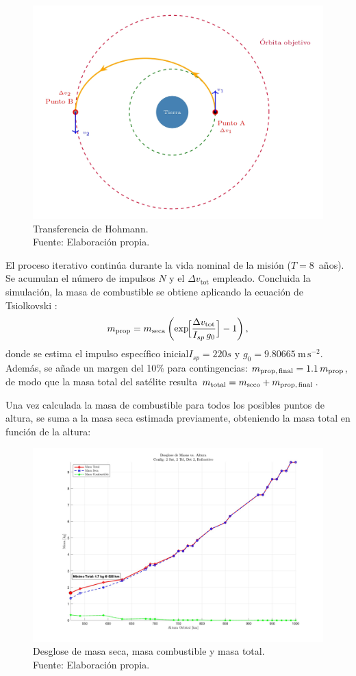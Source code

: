 \begin{figure}[H]
    \centering
    \includegraphics[width=0.5\linewidth]{5.Mission/TFG_Tikz_7.jpg}
    \caption{Transferencia de Hohmann. \\Fuente: Elaboración propia.}
    \label{fig:enter-label}
\end{figure}

El proceso iterativo continúa durante la vida nominal de la misión
(\(T = 8\)~años).  
Se acumulan el número de impulsos \(N\) y el \(\Delta v_{\text{tot}}\)
empleado.  
Concluida la simulación, la masa de combustible se obtiene aplicando la ecuación de Tsiolkovski \cite{curtis2020orbital}:
\begin{equation}
m_{\text{prop}} = m_{\text{seca}}
\left(\exp\!\Bigl[\frac{\Delta v_{\text{tot}}}{I_{sp}\,g_{0}}\Bigr]-1\right),
\label{eq:tsiolkovsky}
\end{equation}
donde se estima el impulso específico inicial\(I_{sp}= 220s\)  y
\(g_{0}=9.80665\ \mathrm{m\,s^{-2}}\).
Además, se añade un margen del 10\% para contingencias:
\(
m_{\text{prop,\,final}}=1.1\,m_{\text{prop}}
\),
de modo que la masa total del satélite resulta
\(m_{\text{total}} = m_{\text{seco}} + m_{\text{prop,\,final}}\).


Una vez calculada la masa de combustible para todos los posibles puntos de altura, se suma a la masa seca estimada previamente, obteniendo la masa total en función de la altura:

\begin{figure}[H]
    \centering
    \includegraphics[width=1\linewidth]{5.Mission/MasaDesglose_2sat_2tel_Det2_Refractivo.jpg}
    \caption{Desglose de masa seca, masa combustible y masa total. \\Fuente: Elaboración propia.}
\end{figure}

